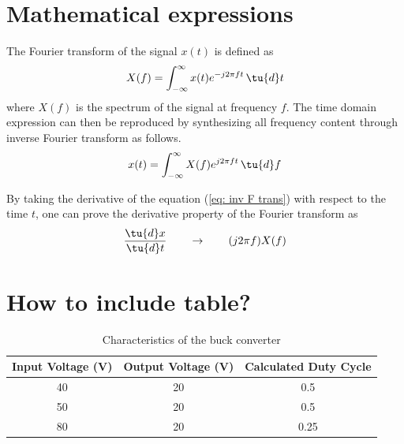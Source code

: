 \documentclass[12pt,a4paper]{article}
\begin{document}

\newpage
{}   
\tableofcontents
\newpage
{} 


\blindtext[1]

\section{Mathematical expressions}
The Fourier transform of the signal $x(t)$ is defined as 
\begin{equation}
    X(f)=\int_{-\infty}^{\infty} x(t) e^{-j2\pi ft} \, \tu{d}t
    \label{eq: F trans}
\end{equation}
where $X(f)$ is the spectrum of the signal at frequency $f$. The time domain expression can then be reproduced by synthesizing all frequency content through inverse Fourier transform as follows.
\begin{equation}
    x(t)=\int_{-\infty}^{\infty} X(f) e^{j2\pi ft} \, \tu{d}f
    \label{eq: inv F trans}
\end{equation}

By taking the derivative of the equation (\ref{eq: inv F trans}) with respect to the time $t$, one can prove the derivative property of the Fourier transform as
\begin{equation}
    \frac{\tu{d}x}{\tu{d}t} \qquad \to \qquad (j2\pi f) X(f)
    \label{eq: deriv.}
\end{equation}



\section{How to include table?}
\blindtext[1]

\begin{table}[H]
    \caption{Characteristics of the buck converter}
    \label{tab: Data}
    \centering
    \begin{tabular}{c|c|c}
    \toprule
     \bf{Input Voltage (V)}& \bf{Output Voltage (V)} & \textbf{Calculated Duty Cycle} \\
     \midrule
     40 & 20 & 0.5\\
     50 & 20 & 0.5 \\
     80 & 20 & 0.25 \\
     \bottomrule
    \end{tabular}
\end{table}
\end{document}
